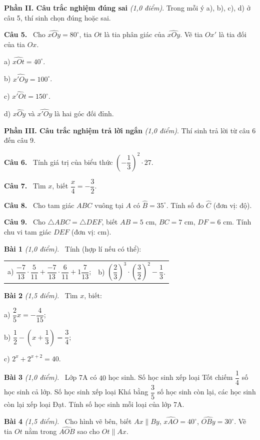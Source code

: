 \documentclass[12pt,a4paper]{article}
\newcommand{\cau}[1]{\par\medskip\textbf{Câu #1.}~}
\newcommand{\bai}[2]{\par\medskip\textbf{Bài #1} \textit{(#2)}.~}
\newcommand{\y}[1]{\par\hspace*{0.6cm}#1}
\newcommand{\phan}[1]{\par\bigskip{\large\textbf{#1}}\par\smallskip}
\begin{document}
\medskip\textbf{Phần II. Câu trắc nghiệm đúng sai} \textit{(1,0 điểm)}. Trong mỗi ý a), b), c), d) ở câu 5, thí sinh chọn đúng hoặc sai.
\cau{5} Cho $\widehat{xOy}=80^\circ$, tia $Ot$ là tia phân giác của $\widehat{xOy}$. Vẽ tia $Ox'$ là tia đối của tia $Ox$.
\y{a) $\widehat{xOt}=40^\circ$.}
\y{b) $\widehat{x'Oy}=100^\circ$.}
\y{c) $\widehat{x'Ot}=150^\circ$.}
\y{d) $\widehat{xOy}$ và $\widehat{x'Oy}$ là hai góc đối đỉnh.}

\medskip\textbf{Phần III. Câu trắc nghiệm trả lời ngắn} \textit{(1,0 điểm)}. Thí sinh trả lời từ câu 6 đến câu 9.
\cau{6} Tính giá trị của biểu thức $\left(-\dfrac{1}{3}\right)^{2}\cdot 27$.
\cau{7} Tìm $x$, biết $\dfrac{x}{4}=-\dfrac{3}{2}$.
\cau{8} Cho tam giác $ABC$ vuông tại $A$ có $\widehat{B}=35^\circ$. Tính số đo $\widehat{C}$ (đơn vị: độ).
\cau{9} Cho $\triangle ABC=\triangle DEF$, biết $AB=5$ cm, $BC=7$ cm, $DF=6$ cm. Tính chu vi tam giác $DEF$ (đơn vị: cm).
\phan{B. TỰ LUẬN (7,0 điểm)}
\bai{1}{1,0 điểm} Tính (hợp lí nếu có thể):
\par\noindent\begin{tabularx}{\linewidth}{@{\hspace{0.6cm}}XX@{}}a) $\dfrac{-7}{13}\cdot\dfrac{5}{11}+\dfrac{-7}{13}\cdot\dfrac{6}{11}+1\dfrac{7}{13}$; & b) $\left(\dfrac{2}{3}\right)^{3}\cdot\left(\dfrac{3}{2}\right)^{2}-\dfrac{1}{3}$.\end{tabularx}
\bai{2}{1,5 điểm} Tìm $x$, biết:
\y{a) $\dfrac{2}{5}x=-\dfrac{4}{15}$;}
\y{b) $\dfrac{1}{2}-\left(x+\dfrac{1}{3}\right)=\dfrac{3}{4}$;}
\y{c) $2^{x}+2^{x+2}=40$.}
\bai{3}{1,0 điểm} Lớp 7A có $40$ học sinh. Số học sinh xếp loại Tốt chiếm $\dfrac{1}{4}$ số học sinh cả lớp. Số học sinh xếp loại Khá bằng $\dfrac{3}{5}$ số học sinh còn lại, các học sinh còn lại xếp loại Đạt. Tính số học sinh mỗi loại của lớp 7A.
\bai{4}{1,5 điểm} Cho hình vẽ bên, biết $Ax\parallel By$, $\widehat{xAO}=40^\circ$, $\widehat{OBy}=30^\circ$. Vẽ tia $Ot$ nằm trong $\widehat{AOB}$ sao cho $Ot\parallel Ax$.
\end{document}
